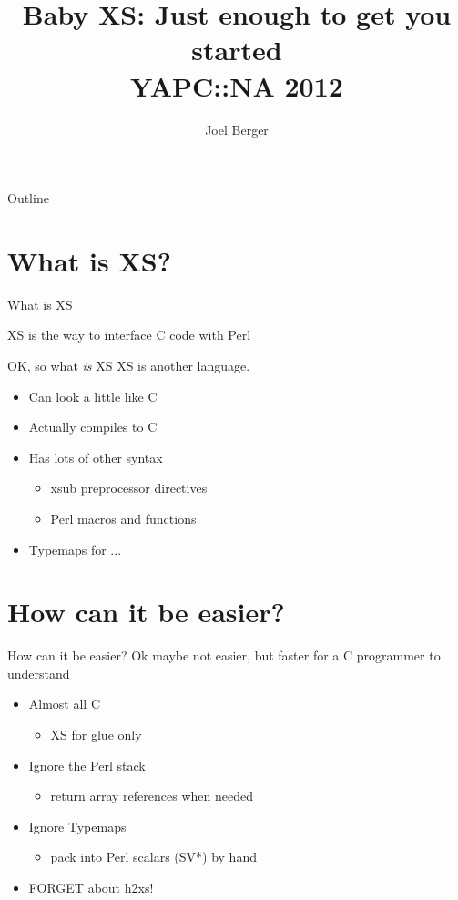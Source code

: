 \documentclass{beamer}
\title[Baby XS]{Baby XS: Just enough to get you started\\YAPC::NA 2012}
\author{Joel Berger}
\institute[UIC]{University of Illinois at Chicago}
\providecommand{\subitem}[1]{\begin{itemize}\item#1\end{itemize}}
\begin{document}
\lstset{basicstyle=\tiny}

\begin{frame}
  \maketitle
\end{frame}

\begin{frame}{Outline}
  \tableofcontents
\end{frame}

\section{What is XS?}

\begin{frame}{What is XS}
  \begin{block}{}
    XS is the way to interface C code with Perl
  \end{block}
\end{frame}

\begin{frame}{OK, so what \emph{is} XS}
  XS is another language.
  \begin{itemize}
    \item Can look a little like C
    \item Actually compiles to C
    \item Has lots of other syntax
      \begin{itemize}
        \item xsub preprocessor directives
        \item Perl macros and functions
      \end{itemize}
    \item Typemaps for ...
  \end{itemize}
\end{frame}

\section{How can it be easier?}

\begin{frame}{How can it be easier?}
  Ok maybe not easier, but faster for a C programmer to understand
  \begin{itemize}
    \item Almost all C
      \subitem{XS for glue only}
    \item Ignore the Perl stack
      \subitem{return array references when needed}
    \item Ignore Typemaps
      \subitem{pack into Perl scalars (SV*) by hand}
    \item FORGET about h2xs!
  \end{itemize}
\end{frame}
\end{document}

